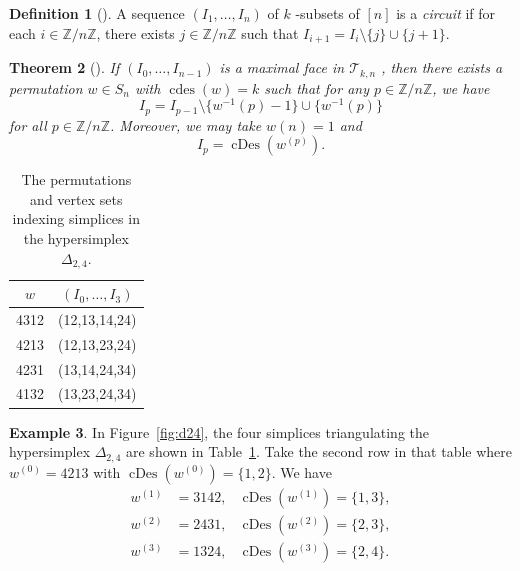 \documentclass[10pt,a4paper]{amsart}
\theoremstyle{plain}
\newtheorem{theorem}{Theorem}[section]
\theoremstyle{definition}
\newtheorem{definition}[theorem]{Definition}
\newtheorem{example}[theorem]{Example}
\newcommand{\Z}{\mathbb{Z}}
\newcommand{\Tri}{\mathcal{T}_{k,n}}
\DeclareMathOperator{\cDes}{cDes}
\DeclareMathOperator{\cdes}{cdes}
\begin{document}
\begin{definition}[\cite{alcove1}]
	A sequence $ (I_1,\dots,I_n) $ of $ k $ -subsets of $ [n] $
	is a \emph{circuit} if for each $ i \in \Z/n\Z $, there exists $ j \in \Z/n\Z $ such that $
		I_{i+1} = I_i \setminus \{j\} \cup \{j+1\} $.
\end{definition}

\begin{theorem}[\cite{alcove1,magicnumber}]\label{thm:max_face}
	If $ (I_0,\dots,I_{n-1}) $
	is a maximal face in $ \Tri $
, then there exists a permutation $ w \in S_n $ with $ \cdes(w) = k $ such that  for any $p \in \Z/n\Z$, we have
	\begin{equation}\label{eq:circuit}
		I_{p} = I_{p-1} \setminus \{w^{-1}(p)-1\} \cup \{w^{-1}(p)\}
	\end{equation}
	for all $p \in \Z/n\Z$. Moreover, we may take $w(n)=1$ and
	\begin{equation}\label{eq:cDescirc}
		I_p = \cDes\left(w^{(p)}\right).
	\end{equation}
\end{theorem}

\begin{table}
	\begin{tabular}{|c|c|}
		\hline
		$w$  & $(I_0,\dots,I_3)$ \\
		\hline
		4312 & (12,13,14,24)     \\
		\hline
		4213 & (12,13,23,24)     \\
		\hline
		4231 & (13,14,24,34)     \\
		\hline
		4132 & (13,23,24,34)     \\
		\hline
	\end{tabular}
	\caption{The permutations and vertex sets indexing simplices in the hypersimplex $\Delta_{2,4}$.}\label{tab:d24}
\end{table}

\begin{example}\label{ex:maxface}
	In Figure~\ref{fig:d24}, the four simplices triangulating the hypersimplex $\Delta_{2,4}$ are shown in Table~\ref{tab:d24}.
	Take the second row in that table where $w^{(0)} = 4213$ with $\cDes(w^{(0)}) = \{1,2\}$. We have
	\begin{align*}
		w^{(1)} & = 3142, & \cDes(w^{(1)}) = \{1,3\}, \\
		w^{(2)} & = 2431, & \cDes(w^{(2)}) = \{2,3\}, \\
		w^{(3)} & = 1324, & \cDes(w^{(3)}) = \{2,4\}.
	\end{align*}
\end{example}
\end{document}
